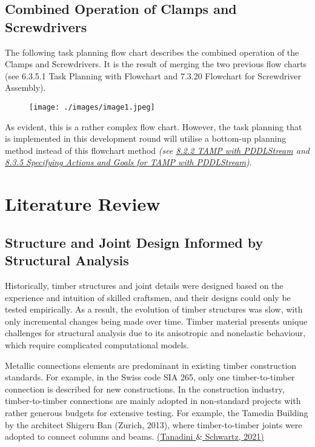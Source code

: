 \subsection{Combined Operation of Clamps and Screwdrivers}

The following task planning flow chart describes the combined operation of the Clamps and Screwdrivers. It is the result of merging the two previous flow charts (see 6.3.5.1 Task Planning with Flowchart and 7.3.20 Flowchart for Screwdriver Assembly).

\begin{figure}[H]
\texttt{[image: ./images/image1.jpeg]}
\end{figure}


As evident, this is a rather complex flow chart. However, the task planning that is implemented in this development round will utilise a bottom-up planning method instead of this flowchart method \textit{(see \uline{8.2.2 TAMP with PDDLStream} and \uline{8.3.5 Specifying Actions and Goals for TAMP with PDDLStream})}.

\section{Literature Review}

\subsection{Structure and Joint Design Informed by Structural Analysis}

Historically, timber structures and joint details were designed based on the experience and intuition of skilled craftsmen, and their designs could only be tested empirically. As a result, the evolution of timber structures was slow, with only incremental changes being made over time. Timber material presents unique challenges for structural analysis due to its anisotropic and nonelastic behaviour, which require complicated computational models. 

Metallic connections elements are predominant in existing timber construction standards. For example, in the Swiss code SIA 265, only one timber-to-timber connection is described for new constructions. In the construction industry, timber-to-timber connections are mainly adopted in non-standard projects with rather generous budgets for extensive testing. For example, the Tamedia Building by the architect Shigeru Ban (Zurich, 2013), where timber-to-timber joints were adopted to connect columns and beams. \href{https://www.zotero.org/google-docs/?9ElYpY}{(Tanadini $\&$ Schwartz, 2021)}


